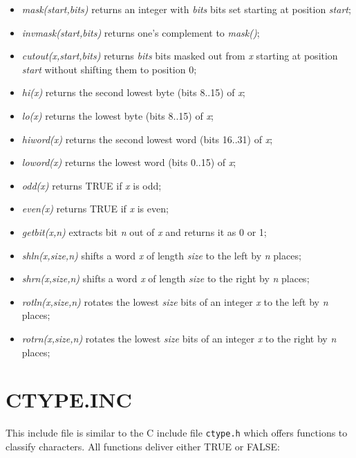 \documentclass[12pt,twoside]{report}
\begin{document}
\begin{itemize}
\item{{\em mask(start,bits)} returns an integer with {\em bits} bits set
      starting at position {\em start};}
\item{{\em invmask(start,bits)} returns one's complement to {\em
      mask()};}
\item{{\em cutout(x,start,bits)} returns {\em bits} bits masked out from
      {\em x} starting at position {\em start} without shifting them to
      position 0;}
\item{{\em hi(x)} returns the second lowest byte (bits 8..15) of {\em
      x};}
\item{{\em lo(x)} returns the lowest byte (bits 8..15) of {\em x};}
\item{{\em hiword(x)} returns the second lowest word (bits 16..31) of
      {\em x};}
\item{{\em loword(x)} returns the lowest word (bits 0..15) of {\em x};}
\item{{\em odd(x)} returns TRUE if {\em x} is odd;}
\item{{\em even(x)} returns TRUE if {\em x} is even;}
\item{{\em getbit(x,n)} extracts bit {\em n} out of {\em x} and returns
      it as 0 or 1;}
\item{{\em shln(x,size,n)} shifts a word {\em x} of length {\em size} to
      the left by {\em n} places;}
\item{{\em shrn(x,size,n)} shifts a word {\em x} of length {\em size} to
      the right by {\em n} places;}
\item{{\em rotln(x,size,n)} rotates the lowest {\em size} bits of an
      integer {\em x} to the left by {\em n} places;}
\item{{\em rotrn(x,size,n)} rotates the lowest {\em size} bits of an
      integer {\em x} to the right by {\em n} places;}
\end{itemize}

\section{CTYPE.INC}

This include file is similar to the C include file {\tt ctype.h} which
offers functions to classify characters.  All functions deliver either
TRUE or FALSE:
\end{document}
